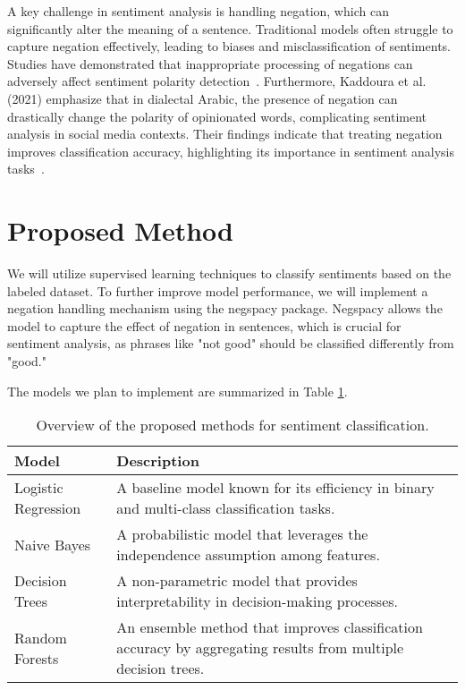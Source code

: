 \documentclass[runningheads]{llncs}
\begin{document}
A key challenge in sentiment analysis is handling negation, which can significantly alter the 
meaning of a sentence. Traditional models often struggle to capture negation effectively, leading 
to biases and misclassification of sentiments. Studies have demonstrated that inappropriate processing 
of negations can adversely affect sentiment polarity detection~\cite{ref_article2}. Furthermore, 
Kaddoura et al. (2021) emphasize that in dialectal Arabic, the presence of negation can drastically 
change the polarity of opinionated words, complicating sentiment analysis in social media contexts. 
Their findings indicate that treating negation improves classification accuracy, highlighting its 
importance in sentiment analysis tasks~\cite{ref_article3}.

\section{Proposed Method}
We will utilize supervised learning techniques to classify sentiments based on the labeled dataset. 
To further improve model performance, we will implement a negation handling mechanism using the 
negspacy package. Negspacy allows the model to capture the effect of negation in sentences, which 
is crucial for sentiment analysis, as phrases like "not good" should be classified differently from "good."

The models we plan to implement are summarized in Table \ref{tab:methods}.

\begin{table}[h!]
    \centering
    \begin{tabular}{|l|p{10cm}|}
        \hline
        \textbf{Model} & \textbf{Description} \\ \hline
        Logistic Regression & A baseline model known for its efficiency in binary and multi-class classification tasks. \\ \hline
        Naive Bayes & A probabilistic model that leverages the independence assumption among features. \\ \hline
        Decision Trees & A non-parametric model that provides interpretability in decision-making processes. \\ \hline
        Random Forests & An ensemble method that improves classification accuracy by aggregating results from multiple decision trees. \\ \hline
    \end{tabular}
    \caption{Overview of the proposed methods for sentiment classification.}
    \label{tab:methods}
\end{table}
\end{document}
